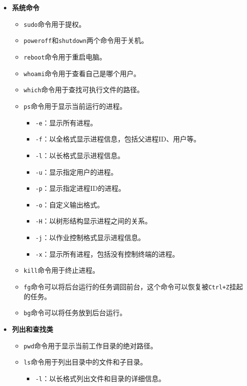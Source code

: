 \begin{itemize}
  \item \textbf{系统命令}
    \begin{itemize}
      \item \texttt{sudo}命令用于提权。
      \item \texttt{poweroff}和\texttt{shutdown}两个命令用于关机。
      \item \texttt{reboot}命令用于重启电脑。
      \item \texttt{whoami}命令用于查看自己是哪个用户。
      \item \texttt{which}命令用于查找可执行文件的路径。
      \item \texttt{ps}命令用于显示当前运行的进程。
        \begin{itemize}
          \item \texttt{-e}：显示所有进程。
          \item \texttt{-f}：以全格式显示进程信息，包括父进程ID、用户等。
          \item \texttt{-l}：以长格式显示进程信息。
          \item \texttt{-u}：显示指定用户的进程。
          \item \texttt{-p}：显示指定进程ID的进程。
          \item \texttt{-o}：自定义输出格式。
          \item \texttt{-H}：以树形结构显示进程之间的关系。
          \item \texttt{-j}：以作业控制格式显示进程信息。
          \item \texttt{-x}：显示所有进程，包括没有控制终端的进程。
        \end{itemize}
      \item \texttt{kill}命令用于终止进程。
      \item \texttt{fg}命令可以将后台运行的任务调回前台，这个命令可以恢复被\texttt{Ctrl+Z}挂起的任务。
      \item \texttt{bg}命令可以将任务放到后台运行。
    \end{itemize}
  \item \textbf{列出和查找类}
    \begin{itemize}
      \item \texttt{pwd}命令用于显示当前工作目录的绝对路径。
      \item \texttt{ls}命令用于列出目录中的文件和子目录。
        \begin{itemize}
          \item \texttt{-l}：以长格式列出文件和目录的详细信息。

\end{itemize}
\end{itemize}
\end{itemize}

